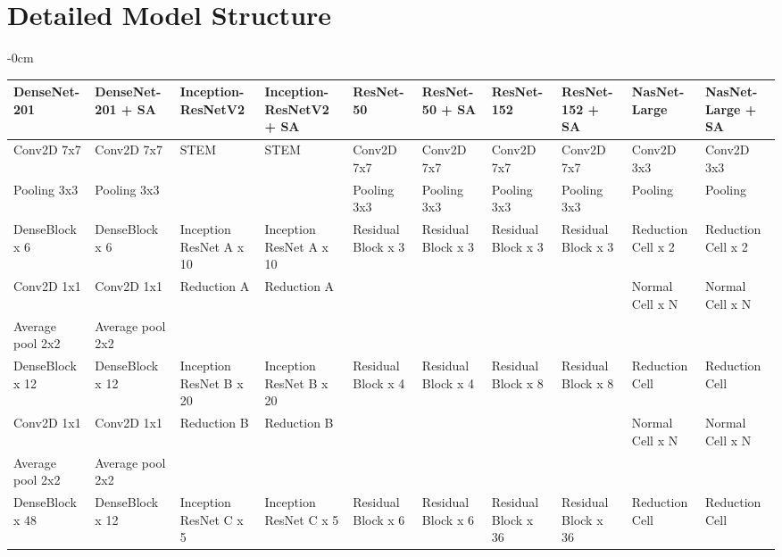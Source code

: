 \documentclass[sensors,article,submit,pdftex,moreauthors]{Definitions/mdpi}
\begin{document}

\appendixstart
\appendix
\section[\appendixname~\thesection]{Detailed Model Structure}

\begin{table}[H]
	\begin{adjustwidth}{-\extralength}{0cm}
		\begin{tabularx}{\fulllength}{p{1.4cm} | p{1.4cm} | p{1.4cm} | p{1.4cm} | p{1.4cm} | p{1.4cm} | p{1.4cm} | p{1.4cm} | p{1.4cm} | p{1.4cm}}
			\toprule
			\textbf{DenseNet-201} & \textbf{DenseNet-201 + SA} & \textbf{Inception-ResNetV2} & \textbf{Inception-ResNetV2 + SA} & \textbf{ResNet-50} & \textbf{ResNet-50 + SA} & \textbf{ResNet-152} & \textbf{ResNet-152 + SA} & \textbf{NasNet-Large} & \textbf{NasNet-Large + SA}\\
			\midrule
			Conv2D 7x7 & Conv2D 7x7 & STEM& STEM& Conv2D 7x7& Conv2D 7x7& Conv2D 7x7& Conv2D 7x7& Conv2D 3x3& Conv2D 3x3\\ \hline
			Pooling 3x3 & Pooling 3x3 & & & Pooling 3x3& Pooling  3x3& Pooling  3x3& Pooling  3x3& Pooling& Pooling\\ \hline		
			DenseBlock x 6 & DenseBlock x 6 & Inception ResNet A x 10& Inception ResNet A x 10& Residual Block x 3& Residual Block x 3& Residual Block x 3& Residual Block x 3& Reduction Cell x 2& Reduction Cell x 2\\  \hline
			Conv2D 1x1 & Conv2D 1x1 & Reduction A & Reduction A & & & & & Normal Cell x N& Normal Cell x N\\	\hline			
			Average pool 2x2 & Average pool 2x2 & & & & & & & & \\ \hline			
			DenseBlock x 12 & DenseBlock x 12 & Inception ResNet B x 20& Inception ResNet B x 20& Residual Block x 4& Residual Block x 4& Residual Block x 8& Residual Block x 8& Reduction Cell& Reduction Cell\\ \hline
			Conv2D 1x1 & Conv2D 1x1 & Reduction B & Reduction B & & & & & Normal Cell x N& Normal Cell x N\\			\hline
			Average pool 2x2 & Average pool 2x2 & & & & & & & & \\ \hline
			DenseBlock x 48 & DenseBlock x 12 & Inception ResNet C x 5& Inception ResNet C x 5& Residual Block x 6& Residual Block x 6& Residual Block x 36& Residual Block x 36& Reduction Cell& Reduction Cell\\ \hline

\end{tabularx}
\end{adjustwidth}
\end{table}
\end{document}
